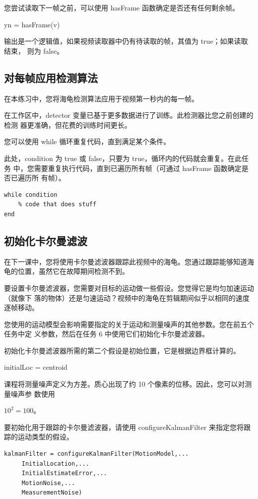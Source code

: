 \documentclass[12pt,a4paper]{article}
\begin{document}
您尝试读取下一帧之前，可以使用 hasFrame 函数确定是否还有任何剩余帧。

yn = hasFrame(v)

输出是一个逻辑值，如果视频读取器中仍有待读取的帧，其值为 true；如果读取结束，
则为 false。

\subsection{对每帧应用检测算法}

在本练习中，您将海龟检测算法应用于视频第一秒内的每一帧。

在工作区中，detector 变量已基于更多数据进行了训练。此检测器比您之前创建的检测
器更准确，但花费的训练时间更长。

您可以使用 while 循环重复代码，直到满足某个条件。

此处，condition 为 true 或 false，只要为 true，循环内的代码就会重复。在此任务
中，您需要重复执行代码，直到已遍历所有帧（可通过 hasFrame 函数确定是否已遍历所
有帧）。

\begin{lstlisting}
while condition
    % code that does stuff
end
\end{lstlisting}

\subsection{初始化卡尔曼滤波}
在下一课中，您将使用卡尔曼滤波器跟踪此视频中的海龟。您通过跟踪能够知道海龟的位置，虽然它在故障期间检测不到。

要设置卡尔曼滤波器，您需要对目标的运动做一些假设。您觉得它是均匀加速运动（就像下
落的物体）还是匀速运动？视频中的海龟在剪辑期间似乎以相同的速度逐帧移动。

您使用的运动模型会影响需要指定的关于运动和测量噪声的其他参数。您在前五个任务中定
义参数，然后在任务 6 中使用它们初始化卡尔曼滤波器。

初始化卡尔曼滤波器所需的第二个假设是初始位置，它是根据边界框计算的。

initialLoc = centroid

课程将测量噪声定义为方差。质心出现了约 10 个像素的位移。因此，您可以对测量噪声参
数使用 

$ 10^2 =100。$

要初始化用于跟踪的卡尔曼滤波器，请使用 configureKalmanFilter 来指定您将跟踪的运动类型的假设。

\begin{lstlisting}
kalmanFilter = configureKalmanFilter(MotionModel,...
     InitialLocation,...
     InitialEstimateError,...
     MotionNoise,...
     MeasurementNoise)
\end{lstlisting}
\end{document}
